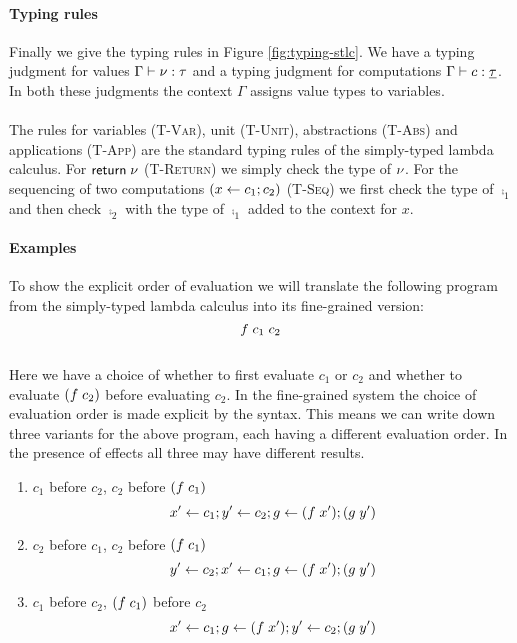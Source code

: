{\paragraph{Typing rules}
Finally we give the typing rules in Figure \ref{fig:typing-stlc}.
We have a typing judgment for values $\Gamma \vdash \nu : \tau$ and a typing judgment for computations $\Gamma \vdash c : \underline{\tau}$.
In both these judgments the context $\Gamma$ assigns value types to variables.
\\\\
The rules for variables ({\footnotesize\textsc{T-Var}}), unit ({\footnotesize\textsc{T-Unit}}), abstractions ({\footnotesize\textsc{T-Abs}}) and applications ({\footnotesize\textsc{T-App}}) are the standard typing rules of the simply-typed lambda calculus.
For $\mathsf{return} \; \nu$ ({\footnotesize\textsc{T-Return}}) we simply check the type of $\nu$.
For the sequencing of two computations $(x \leftarrow c_1 ; c_2)$ ({\footnotesize\textsc{T-Seq}}) we first check the type of $\comp_1$ and then check $\comp_2$ with the type of $\comp_1$ added to the context for $x$.

\iffalse
\paragraph{Examples}
To show the explicit order of evaluation we will translate the following program from the simply-typed lambda calculus into its fine-grained version:\\
\[f \; c_1 \; c_2\]\\
Here we have a choice of whether to first evaluate $c_1$ or $c_2$ and whether to evaluate $(f \; c_2)$ before evaluating $c_2$.
In the fine-grained system the choice of evaluation order is made explicit by the syntax.
This means we can write down three variants for the above program, each having a different evaluation order.
In the presence of effects all three may have different results.

\begin{enumerate}
\itemsep0em 
\item $c_1$ before $c_2$, $c_2$ before $(f \; c_1)$ 
\[x' \leftarrow c_1 ; y' \leftarrow c_2 ; g \leftarrow (f \; x') ; (g \; y')\]
\item $c_2$ before $c_1$, $c_2$ before $(f \; c_1)$
\[y' \leftarrow c_2 ; x' \leftarrow c_1 ; g \leftarrow (f \; x') ; (g \; y')\]
\item $c_1$ before $c_2$, $(f \; c_1)$ before $c_2$
\[x' \leftarrow c_1 ; g \leftarrow (f \; x') ; y' \leftarrow c_2 ; (g \; y')\]
\end{enumerate}

}
